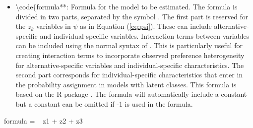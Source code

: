 \begin{itemize}
\tightlist
\item
  \textbackslash code\{formula**: Formula for the model to be estimated.
  The formula is divided in two parts, separated by the symbol \code{|}.
  The first part is reserved for the \(z_k\) variables in \(\psi\) as in
  Equation (\ref{eq:psi}). These can include alternative-specific and
  individual-specific variables. Interaction terms between variables can
  be included using the normal  syntax of .
  This is particularly useful for creating interaction terms to
  incorporate observed preference heterogeneity for alternative-specific
  variables and individual-specific characteristics. The second part
  corresponds for individual-specific characteristics that enter in the
  probability assignment in models with latent classes. This formula is
  based on the R package  \citep{zeileisextended2010}. The
  formula will automatically include a constant but a constant can be
  omitted if -1 is used in the formula.
\end{itemize}

\begin{Schunk}
\begin{Sinput}
formula = ~ z1 + z2 + z3
\end{Sinput}
\end{Schunk}


